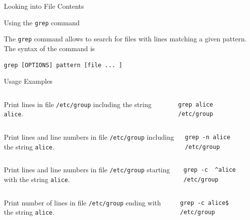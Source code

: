 \begin{frame}[t,fragile]{Looking into File Contents}

  \vspace{-0.3cm}
  \begin{block}{Using the \alert{\texttt{grep}} command}
    {\footnotesize
The \alert{\texttt{grep}} command allows to search for files with lines matching a
given pattern.  The syntax of the command is


        \begin{lstlisting}
grep [OPTIONS] pattern [file ... ]
        \end{lstlisting}

  Usage Examples
}


\vspace{0.1cm}
{\scriptsize
  \begin{columns}
      Print lines in file \texttt{/etc/group} including the string \texttt{alice}.
        \begin{lstlisting}
grep alice /etc/group
        \end{lstlisting}
    \end{columns}
 \begin{columns}
      Print lines and line numbers in file \texttt{/etc/group} including the string \texttt{alice}.
        \begin{lstlisting}
grep -n alice /etc/group
        \end{lstlisting}
    \end{columns}
 \begin{columns}
      Print lines and line numbers in file \texttt{/etc/group} starting with the string \texttt{alice}.
        \begin{lstlisting}
grep -c  ^alice /etc/group
        \end{lstlisting}
    \end{columns}
 \begin{columns}
      Print number of lines in file \texttt{/etc/group} ending with the string \texttt{alice}.
        \begin{lstlisting}
grep -c alice$ /etc/group
        \end{lstlisting} %
    \end{columns}
}  
  \end{block}
\end{frame}
